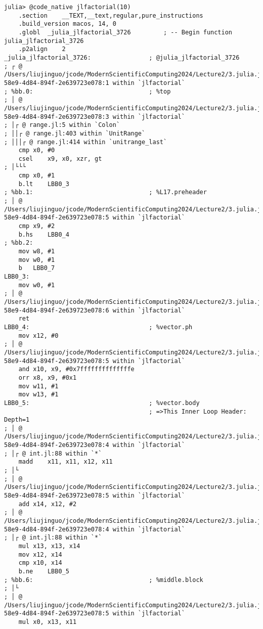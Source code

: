 \documentclass[
  notoc %
]{tufte-book}
\begin{document}
\begin{lstlisting}
julia> @code_native jlfactorial(10)
    .section    __TEXT,__text,regular,pure_instructions
    .build_version macos, 14, 0
    .globl  _julia_jlfactorial_3726         ; -- Begin function julia_jlfactorial_3726
    .p2align    2
_julia_jlfactorial_3726:                ; @julia_jlfactorial_3726
; ┌ @ /Users/liujinguo/jcode/ModernScientificComputing2024/Lecture2/3.julia.jl#==#d2429055-58e9-4d84-894f-2e639723e078:1 within `jlfactorial`
; %bb.0:                                ; %top
; │ @ /Users/liujinguo/jcode/ModernScientificComputing2024/Lecture2/3.julia.jl#==#d2429055-58e9-4d84-894f-2e639723e078:3 within `jlfactorial`
; │┌ @ range.jl:5 within `Colon`
; ││┌ @ range.jl:403 within `UnitRange`
; │││┌ @ range.jl:414 within `unitrange_last`
    cmp x0, #0
    csel    x9, x0, xzr, gt
; │└└└
    cmp x0, #1
    b.lt    LBB0_3
; %bb.1:                                ; %L17.preheader
; │ @ /Users/liujinguo/jcode/ModernScientificComputing2024/Lecture2/3.julia.jl#==#d2429055-58e9-4d84-894f-2e639723e078:5 within `jlfactorial`
    cmp x9, #2
    b.hs    LBB0_4
; %bb.2:
    mov w8, #1
    mov w0, #1
    b   LBB0_7
LBB0_3:
    mov w0, #1
; │ @ /Users/liujinguo/jcode/ModernScientificComputing2024/Lecture2/3.julia.jl#==#d2429055-58e9-4d84-894f-2e639723e078:6 within `jlfactorial`
    ret
LBB0_4:                                 ; %vector.ph
    mov x12, #0
; │ @ /Users/liujinguo/jcode/ModernScientificComputing2024/Lecture2/3.julia.jl#==#d2429055-58e9-4d84-894f-2e639723e078:5 within `jlfactorial`
    and x10, x9, #0x7ffffffffffffffe
    orr x8, x9, #0x1
    mov w11, #1
    mov w13, #1
LBB0_5:                                 ; %vector.body
                                        ; =>This Inner Loop Header: Depth=1
; │ @ /Users/liujinguo/jcode/ModernScientificComputing2024/Lecture2/3.julia.jl#==#d2429055-58e9-4d84-894f-2e639723e078:4 within `jlfactorial`
; │┌ @ int.jl:88 within `*`
    madd    x11, x11, x12, x11
; │└
; │ @ /Users/liujinguo/jcode/ModernScientificComputing2024/Lecture2/3.julia.jl#==#d2429055-58e9-4d84-894f-2e639723e078:5 within `jlfactorial`
    add x14, x12, #2
; │ @ /Users/liujinguo/jcode/ModernScientificComputing2024/Lecture2/3.julia.jl#==#d2429055-58e9-4d84-894f-2e639723e078:4 within `jlfactorial`
; │┌ @ int.jl:88 within `*`
    mul x13, x13, x14
    mov x12, x14
    cmp x10, x14
    b.ne    LBB0_5
; %bb.6:                                ; %middle.block
; │└
; │ @ /Users/liujinguo/jcode/ModernScientificComputing2024/Lecture2/3.julia.jl#==#d2429055-58e9-4d84-894f-2e639723e078:5 within `jlfactorial`
    mul x0, x13, x11

\end{lstlisting}
\end{document}
